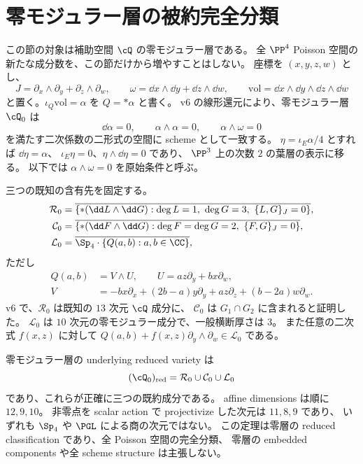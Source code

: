 \section{零モジュラー層の被約完全分類}
\label{sec:zero-boundaries}

この節の対象は補助空間 $\cQ$ の零モジュラー層である。
全 $\PP^4$ Poisson 空間の新たな成分数を、この節だけから増やすことはしない。
座標を $(x,y,z,w)$ とし、
\[
 J=\partial_x\wedge\partial_y+\partial_z\wedge\partial_w,
 \qquad \omega=\dd x\wedge\dd y+\dd z\wedge\dd w,
 \qquad \mathrm{vol}=\dd x\wedge\dd y\wedge\dd z\wedge\dd w
\]
と置く。$\iota_Q\mathrm{vol}=\alpha$ を $Q=*\alpha$ と書く。
v6 の線形還元により、零モジュラー層 $\cQ_0$ は
\[
 \dd\alpha=0,\qquad \alpha\wedge\alpha=0,\qquad
 \alpha\wedge\omega=0
 \tag{Z1}\label{eq:zero-three-conditions}
\]
を満たす二次係数の二形式の空間に scheme として一致する。
$\eta=\iota_E\alpha/4$ とすれば $\dd\eta=\alpha$、
$\iota_E\eta=0$、$\eta\wedge\dd\eta=0$ であり、
$\PP^3$ 上の次数 $2$ の葉層の表示に移る。
以下では $\alpha\wedge\omega=0$ を原始条件と呼ぶ。

三つの既知の含有先を固定する。
\begin{align*}
 \mathcal R_0&=\overline{\{*(\dd L\wedge\dd G):
                   \deg L=1,\ \deg G=3,\ \{L,G\}_J=0\}},\\
 \mathcal C_0&=\overline{\{*(\dd F\wedge\dd G):
                   \deg F=\deg G=2,\ \{F,G\}_J=0\}},\\
 \mathcal L_0&=\overline{\Sp_4\cdot\{Q(a,b):a,b\in\CC\}},
\end{align*}
ただし
\[
\begin{split}
 Q(a,b)&=V\wedge U,\qquad U=az\partial_y+bx\partial_w,\\
 V&=-bx\partial_x+(2b-a)y\partial_y+az\partial_z+(b-2a)w\partial_w.
\end{split}\tag{Z2}\label{eq:zero-log-family}
\]
v6 で、$\mathcal R_0$ は既知の $13$ 次元 $\cQ$ 成分に、
$\mathcal C_0$ は $G_1\cap G_2$ に含まれると証明した。
$\mathcal L_0$ は $10$ 次元の零モジュラー成分で、一般横断厚さは $3$。
また任意の二次式 $f(x,z)$ に対して
$Q(a,b)+f(x,z)\partial_y\wedge\partial_w\in\mathcal L_0$ である。

\begin{theorem}[零モジュラー層の三つの被約成分]
\label{thm:zero-three-components}
零モジュラー層の underlying reduced variety は
\[
 (\cQ_0)_{\mathrm{red}}=\mathcal R_0\cup\mathcal C_0\cup\mathcal L_0
\]
であり、これらが正確に三つの既約成分である。
affine dimensions は順に $12,9,10$。
非零点を scalar action で projectivize した次元は $11,8,9$ であり、
いずれも $\Sp_4$ や $\PGL$ による商の次元ではない。
この定理は零層の reduced classification であり、全 Poisson 空間の完全分類、
零層の embedded components や全 scheme structure は主張しない。
\end{theorem}

